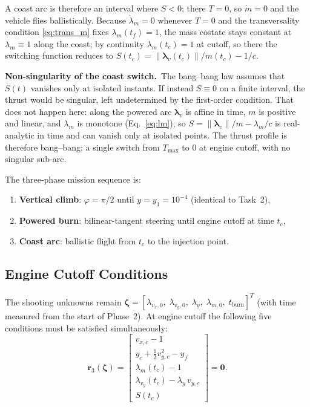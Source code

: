 \documentclass[../main.tex]{subfiles}
\begin{document}
A coast arc is therefore an interval where $S < 0$; there $T = 0$, so $\dot{m} = 0$ and the vehicle flies ballistically. Because $\dot{\lambda}_m = 0$ whenever $T = 0$ and the transversality condition \eqref{eq:trans_m} fixes $\lambda_m(t_f) = 1$, the mass costate stays constant at $\lambda_m \equiv 1$ along the coast; by continuity $\lambda_m(t_c) = 1$ at cutoff, so there the switching function reduces to $S(t_c) = \|\boldsymbol{\lambda}_v(t_c)\|/m(t_c) - 1/c$.

\textbf{Non-singularity of the coast switch.}\ The bang--bang law assumes that $S(t)$ vanishes only at isolated instants. If instead $S \equiv 0$ on a finite interval, the thrust would be singular, left undetermined by the first-order condition. That does not happen here: along the powered arc $\boldsymbol{\lambda}_v$ is affine in time, $m$ is positive and linear, and $\lambda_m$ is monotone (Eq.~\ref{eq:lm}), so $S = \|\boldsymbol{\lambda}_v\|/m - \lambda_m/c$ is real-analytic in time and can vanish only at isolated points. The thrust profile is therefore bang--bang: a single switch from $T_{\max}$ to $0$ at engine cutoff, with no singular sub-arc.

The three-phase mission sequence is:
\begin{enumerate}
    \item \textbf{Vertical climb}: $\varphi = \pi/2$ until $y = y_1 = 10^{-4}$ (identical to Task~2),
    \item \textbf{Powered burn}: bilinear-tangent steering until engine cutoff at time $t_c$,
    \item \textbf{Coast arc}: ballistic flight from $t_c$ to the injection point.
\end{enumerate}

\subsection{Engine Cutoff Conditions}

The shooting unknowns remain $\boldsymbol{\zeta} = [\lambda_{v_x,0},\; \lambda_{v_y,0},\; \lambda_y,\; \lambda_{m,0},\; t_\mathrm{burn}]^T$ (with time measured from the start of Phase~2). At engine cutoff the following five conditions must be satisfied simultaneously:
\begin{equation}
    \mathbf{r}_3(\boldsymbol{\zeta}) =
    \begin{bmatrix}
        v_{x,c} - 1 \\[2pt]
        y_c + \tfrac{1}{2}v_{y,c}^2 - y_f \\[2pt]
        \lambda_m(t_c) - 1 \\[2pt]
        \lambda_{v_y}(t_c) - \lambda_y\, v_{y,c} \\[2pt]
        S(t_c)
    \end{bmatrix} = \mathbf{0}.
    \label{eq:residual3}
\end{equation}
\end{document}
